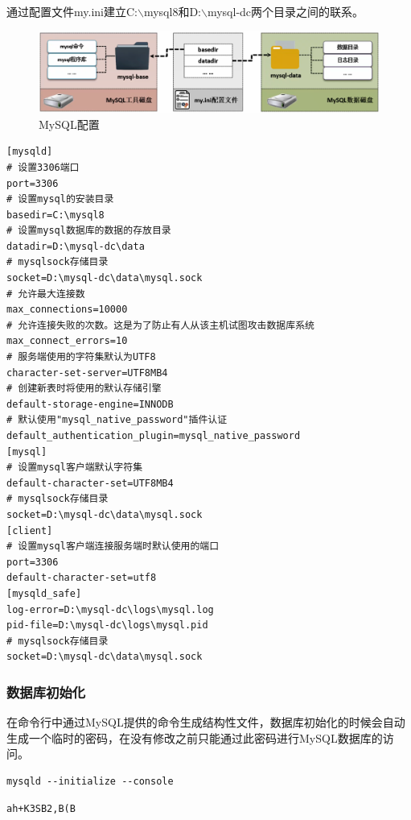 \documentclass[12pt, openany, oneside]{book}
\begin{document}
通过配置文件my.ini建立C:$ \backslash $mysql8和D:$ \backslash $mysql-dc两个目录之间的联系。\\

\begin{figure}[H]
	\centering
	\includegraphics[]{img/C2/4.png}
	\caption{MySQL配置}
\end{figure}


\begin{lstlisting}
[mysqld]
# 设置3306端口
port=3306
# 设置mysql的安装目录
basedir=C:\mysql8
# 设置mysql数据库的数据的存放目录
datadir=D:\mysql-dc\data
# mysqlsock存储目录
socket=D:\mysql-dc\data\mysql.sock
# 允许最大连接数
max_connections=10000
# 允许连接失败的次数。这是为了防止有人从该主机试图攻击数据库系统
max_connect_errors=10
# 服务端使用的字符集默认为UTF8
character-set-server=UTF8MB4
# 创建新表时将使用的默认存储引擎
default-storage-engine=INNODB
# 默认使用"mysql_native_password"插件认证
default_authentication_plugin=mysql_native_password
[mysql]
# 设置mysql客户端默认字符集
default-character-set=UTF8MB4
# mysqlsock存储目录
socket=D:\mysql-dc\data\mysql.sock
[client]
# 设置mysql客户端连接服务端时默认使用的端口
port=3306
default-character-set=utf8
[mysqld_safe]
log-error=D:\mysql-dc\logs\mysql.log
pid-file=D:\mysql-dc\logs\mysql.pid
# mysqlsock存储目录
socket=D:\mysql-dc\data\mysql.sock
\end{lstlisting}

\subsubsection{数据库初始化}

在命令行中通过MySQL提供的命令生成结构性文件，数据库初始化的时候会自动生成一个临时的密码，在没有修改之前只能通过此密码进行MySQL数据库的访问。\\


\begin{lstlisting}
mysqld --initialize --console
\end{lstlisting}

\begin{tcolorbox}
\begin{verbatim}
ah+K3SB2,B(B
	\end{verbatim}
\end{tcolorbox}
\end{document}
